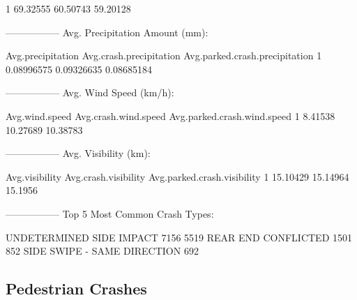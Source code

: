 \documentclass[11pt, a4paper]{article}
\begin{document}
\begin{Schunk}
\begin{Soutput}
1     69.32555           60.50743                  59.20128
\end{Soutput}
\begin{Soutput}
-----------------
Avg. Precipitation Amount (mm):
\end{Soutput}
\begin{Soutput}
  Avg.precipitation Avg.crash.precipitation Avg.parked.crash.precipitation
1        0.08996575              0.09326635                     0.08685184
\end{Soutput}
\begin{Soutput}
-----------------
Avg. Wind Speed (km/h):
\end{Soutput}
\begin{Soutput}
  Avg.wind.speed Avg.crash.wind.speed Avg.parked.crash.wind.speed
1        8.41538             10.27689                    10.38783
\end{Soutput}
\begin{Soutput}
-----------------
Avg. Visibility (km):
\end{Soutput}
\begin{Soutput}
  Avg.visibility Avg.crash.visibility Avg.parked.crash.visibility
1       15.10429             15.14964                     15.1956
\end{Soutput}
\begin{Soutput}
-----------------
Top 5 Most Common Crash Types:
\end{Soutput}
\begin{Soutput}
               UNDETERMINED                 SIDE IMPACT 
                       7156                        5519 
                   REAR END                  CONFLICTED 
                       1501                         852 
SIDE SWIPE - SAME DIRECTION 
                        692 
\end{Soutput}
\end{Schunk}



\pagebreak
\subsection{Pedestrian Crashes}
\end{document}
